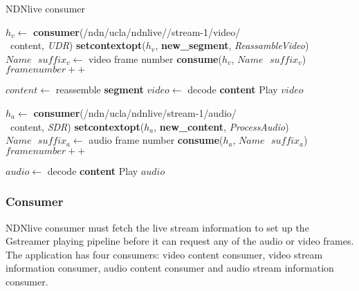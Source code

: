 \begin{algorithm}[hbt]
\caption{NDNlive consumer}
\label{alg:liveconsumer}
\begin{algorithmic}[2]
\State $h_v \leftarrow $ \textbf{consumer}(/ndn/ucla/ndnlive//stream-1/video/\\\ content, \textit{UDR})
\State \textbf{setcontextopt}($h_v$, \textbf{new\_segment}, \textit{ReassambleVideo})
\vspace{0.2cm}
	\State $Name \textbf{ } suffix_v \leftarrow $ video frame number
	\State \textbf{consume}($h_v$, $Name\textbf{ }suffix_v$)
	\State $framenumber ++$
	\EndWhile
\vspace{0.2cm}

    \State $content \leftarrow $ reassemble \textbf{segment}
		\State $video \leftarrow $ decode \textbf{content}
	   	\State Play $video$
	\EndIf
\EndFunction

\vspace{0.4cm}

\State $h_a \leftarrow $ \textbf{consumer}(/ndn/ucla/ndnlive/stream-1/audio/\\\ content, \textit{SDR})
\State \textbf{setcontextopt}($h_a$, \textbf{new\_content}, \textit{ProcessAudio})
\vspace{0.2cm}
	\State $Name \textbf{ } suffix_a \leftarrow $ audio frame number
	\State \textbf{consume}($h_a$, $Name\textbf{ }suffix_a$)
	\State $framenumber ++$
	\EndWhile
\vspace{0.2cm}

   	\State $audio \leftarrow $ decode \textbf{content}
   	\State Play $audio$
\EndFunction
\end{algorithmic}
\end{algorithm}

\subsubsection{Consumer}
\label{ssub:ndnlive_con}
NDNlive consumer must fetch the live stream information to set up the Gstreamer playing pipeline before it can request any of the audio or video frames. The application has four consumers: video content consumer, video stream information consumer, audio content consumer and audio stream information consumer. 

